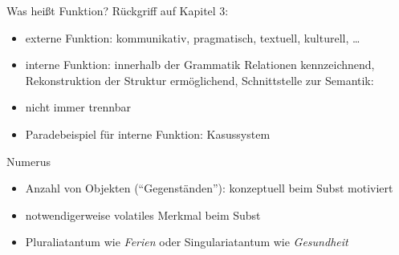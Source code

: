 \begin{frame}
  {Was heißt Funktion?}
  \pause
  Rückgriff auf Kapitel 3:
  \pause
  \Halbzeile
  \begin{itemize}[<+->]
    \item \alert{externe} Funktion: kommunikativ, pragmatisch, textuell, kulturell, \dots
    \item \alert{interne} Funktion: innerhalb der Grammatik Relationen kennzeichnend,
      Rekonstruktion der Struktur ermöglichend, Schnittstelle zur Semantik: 
    \item nicht immer trennbar
      \Halbzeile
    \item Paradebeispiel für interne Funktion: \alert{Kasussystem}
  \end{itemize}
\end{frame}

\begin{frame}
  {Numerus}
  \pause
  \begin{exe}
    \ex
    \begin{xlist}
      \pause
    \end{xlist}
    \pause
    \ex
    \begin{xlist}
      \pause
    \end{xlist}
  \end{exe}
  \pause
  \Halbzeile
  \begin{itemize}[<+->]
    \item \alert{Anzahl von Objekten ("`Gegenständen"')}: konzeptuell beim Subst motiviert
    \item notwendigerweise volatiles Merkmal beim Subst
    \item Pluraliatantum wie \textit{Ferien} oder Singulariatantum wie \textit{Gesundheit}
  \end{itemize}
\end{frame}


